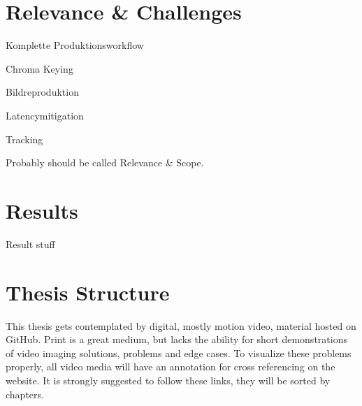 \section{Relevance \& Challenges}
\label{sec:intro:relevance}

\begin{my_list}
	\item Komplette Produktionsworkflow
	\item Chroma Keying
	\item Bildreproduktion
	\item Latencymitigation
	\item Tracking
\end{my_list}

Probably should be called Relevance \& Scope.

\section{Results}
\label{sec:intro:results}

Result stuff

\section{Thesis Structure}
\label{sec:intro:structure}

This thesis gets contemplated by digital, mostly motion video, material hosted 
on GitHub. Print is a great medium, but lacks the ability for short 
demonstrations of video imaging solutions, problems and edge cases. To 
visualize these problems properly, all video media will have an annotation for 
cross referencing on the website. It is strongly suggested to follow these 
links, they will be sorted by chapters.